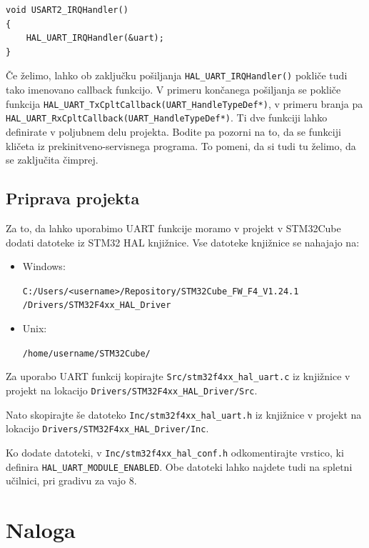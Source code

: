 \documentclass[12pt,letterpaper]{article}
\begin{document}
\begin{center}
\begin{lstlisting}[style=CStyle]
void USART2_IRQHandler()
{
    HAL_UART_IRQHandler(&uart);
}
\end{lstlisting}
\end{center}

Če želimo, lahko ob zaključku pošiljanja \texttt{HAL\_UART\_IRQHandler()} pokliče tudi tako imenovano callback funkcijo. V primeru končanega po\-ši\-lja\-nja se pokliče funkcija \texttt{HAL\_UART\_TxCpltCallback(UART\_HandleTypeDef*)}, v primeru branja pa \texttt{HAL\_UART\_RxCpltCallback(UART\_HandleTypeDef*)}. Ti dve funkciji lahko definirate v poljubnem delu projekta. Bodite pa pozorni na to, da se funkciji kličeta iz prekinitveno-servisnega programa. To pomeni, da si tudi tu želimo, da se zaključita čimprej.
\newpage
\subsection*{Priprava projekta}

Za to, da lahko uporabimo UART funkcije moramo v projekt v STM32Cube dodati datoteke iz STM32 HAL knjižnice. Vse datoteke knjižnice se nahajajo na:

\begin{itemize}
    \item Windows:
    
    \texttt{C:/Users/<username>/Repository/STM32Cube\_FW\_F4\_V1.24.1\\/Drivers/STM32F4xx\_HAL\_Driver}
    
    \item Unix:
    
    \texttt{/home/username/STM32Cube/}
\end{itemize}

Za uporabo UART funkcij kopirajte \texttt{Src/stm32f4xx\_hal\_uart.c} iz knji\-žni\-ce v projekt na lokacijo \texttt{Drivers/STM32F4xx\_HAL\_Driver/Src}.

Nato skopirajte še datoteko \texttt{Inc/stm32f4xx\_hal\_uart.h} iz knjižnice v projekt na lokacijo \texttt{Drivers/STM32F4xx\_HAL\_Driver/Inc}.

Ko dodate datoteki, v \texttt{Inc/stm32f4xx\_hal\_conf.h} odkomentirajte vrstico, ki definira \texttt{HAL\_UART\_MODULE\_ENABLED}. Obe datoteki lahko najdete tudi na spletni učilnici, pri gradivu za vajo 8.

\newpage

\section*{Naloga}
\end{document}
